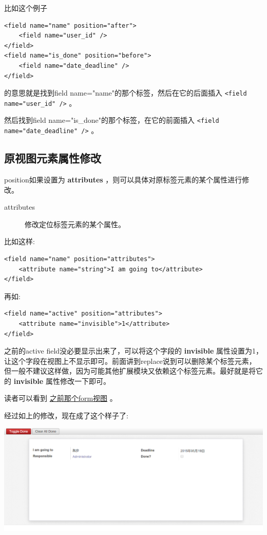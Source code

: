\documentclass[11pt,a4paper]{sphinxmanual}
\begin{document}
比如这个例子
\begin{Verbatim}
<field name="name" position="after">
    <field name="user_id" />
</field>
<field name="is_done" position="before">
    <field name="date_deadline" />
</field>
\end{Verbatim}
的意思就是找到field name="name"的那个标签，然后在它的后面插入 \verb~<field name="user_id" />~ 。

然后找到field name="is\_done"的那个标签，在它的前面插入 \verb~<field name="date_deadline" />~ 。


\subsection{原视图元素属性修改}
\label{sec-8-4-2}
position如果设置为 \textbf{attributes} ，则可以具体对原标签元素的某个属性进行修改。

\begin{description}
\item[{attributes}] 修改定位标签元素的某个属性。
\end{description}

比如这样:
\begin{Verbatim}
<field name="name" position="attributes">
    <attribute name="string">I am going to</attribute>
</field>
\end{Verbatim}

再如:
\begin{Verbatim}
<field name="active" position="attributes">
    <attribute name="invisible">1</attribute>
</field>
\end{Verbatim}

之前的active field没必要显示出来了，可以将这个字段的 \textbf{invisible} 属性设置为1，让这个字段在视图上不显示即可。前面讲到replace说到可以删除某个标签元素，但一般不建议这样做，因为可能其他扩展模块又依赖这个标签元素。最好就是将它的 \textbf{invisible} 属性修改一下即可。

读者可以看到 \hyperref[todo_app-form1]{之前那个form视图} 。

经过如上的修改，现在成了这个样子了:

\includegraphics[keepaspectratio,max width=0.95\linewidth]{images/todo_app03.png}
\end{document}
